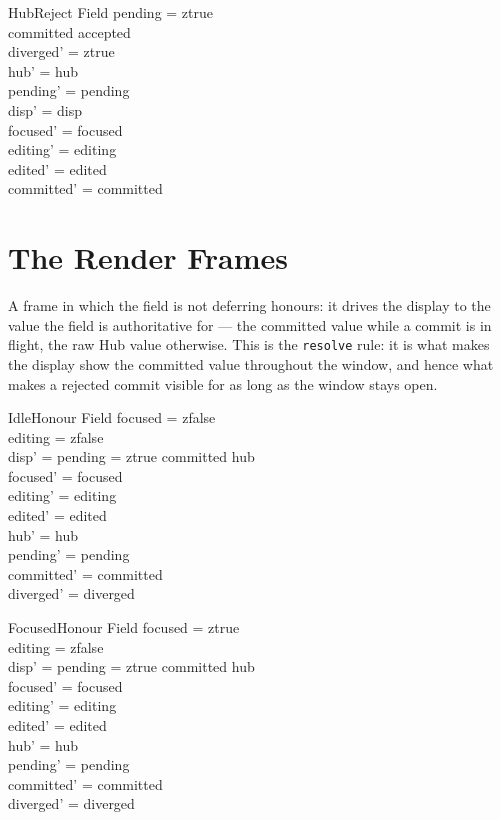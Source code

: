 \documentclass[a4paper,10pt,fleqn]{article}
\begin{document}
\begin{schema}{HubReject}
  \Delta Field
\where
  pending = ztrue \\
  committed \notin accepted \\
  diverged' = ztrue \\
  hub' = hub \\
  pending' = pending \\
  disp' = disp \\
  focused' = focused \\
  editing' = editing \\
  edited' = edited \\
  committed' = committed
\end{schema}

\section{The Render Frames}
\label{sec:frames}

A frame in which the field is not deferring honours: it drives the display to the
value the field is authoritative for --- the committed value while a commit is in
flight, the raw Hub value otherwise.  This is the \texttt{resolve} rule: it is
what makes the display show the committed value throughout the window, and hence
what makes a rejected commit visible for as long as the window stays open.

\begin{schema}{IdleHonour}
  \Delta Field
\where
  focused = zfalse \\
  editing = zfalse \\
  disp' = \IF pending = ztrue \THEN committed \ELSE hub \\
  focused' = focused \\
  editing' = editing \\
  edited' = edited \\
  hub' = hub \\
  pending' = pending \\
  committed' = committed \\
  diverged' = diverged
\end{schema}

\begin{schema}{FocusedHonour}
  \Delta Field
\where
  focused = ztrue \\
  editing = zfalse \\
  disp' = \IF pending = ztrue \THEN committed \ELSE hub \\
  focused' = focused \\
  editing' = editing \\
  edited' = edited \\
  hub' = hub \\
  pending' = pending \\
  committed' = committed \\
  diverged' = diverged
\end{schema}
\end{document}
